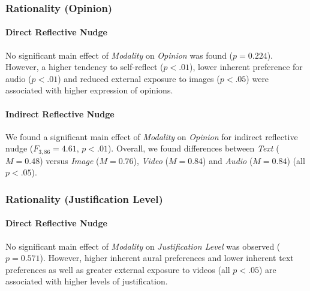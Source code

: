\subsubsection{Rationality (Opinion)}

\paragraph{Direct Reflective Nudge} No significant main effect of \emph{Modality} on \emph{Opinion} was found ($p=0.224$). However, a higher tendency to self-reflect ($p<.01$), lower inherent preference for audio ($p<.01$) and reduced external exposure to images ($p<.05$) were associated with higher expression of opinions. %

\paragraph{Indirect Reflective Nudge} We found a significant main effect of \emph{Modality} on \emph{Opinion} for indirect reflective nudge ($F_{3,86} = 4.61$, $p<.01$). Overall, we found differences between \emph{Text} ($M = 0.48$) versus \emph{Image} ($M = 0.76$), \emph{Video} ($M = 0.84$) and \emph{Audio} ($M = 0.84$) (all $p<.05$). %


\subsubsection{Rationality (Justification Level)}

\paragraph{Direct Reflective Nudge} No significant main effect of \emph{Modality} on \emph{Justification Level} was observed ($p = 0.571$). However, higher inherent aural preferences and lower inherent text preferences as well as greater external exposure to videos (all $p<.05$) are associated with higher levels of justification. %

